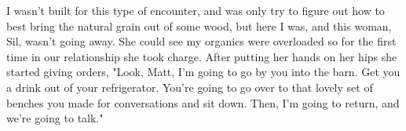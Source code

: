 I wasn't built for this type of encounter, and was only try to figure
out how to best bring the natural grain out of some wood, but here I
was, and this woman, Sil, wasn't going away.  She could see my organics
were overloaded so for the first time in our relationship she took
charge. 
After putting her hands on her hips she started giving orders, "Look,
Matt, I'm going to go by you into the barn.  Get you a drink out of your
refrigerator.  You're going to go over to that lovely set of benches you
made for conversations and sit down. Then, I'm going to return, and we're going to
talk." 


